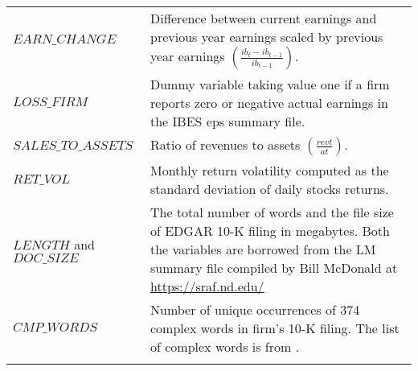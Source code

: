 \begin{ThreePartTable}
\begin{spacing}{1.0}
\begin{longtable}[t]{>{\raggedright\arraybackslash}p{4.2cm}>{\raggedright\arraybackslash}p{10.5cm}}
\addlinespace
$EARN\_CHANGE$ & Difference between current earnings and previous year earnings scaled by previous year earnings $\left( \frac{ib_t - ib_{t-1}}{ib_{t-1}} \right)$.\\
\addlinespace
$LOSS\_FIRM$ & Dummy variable taking value one if a firm reports zero or negative actual earnings in the IBES eps summary file.\\
\addlinespace
$SALES\_TO\_ASSETS$ & Ratio of revenues to assets $\left( \frac{revt}{at} \right)$.\\
\addlinespace
$RET\_VOL$ & Monthly return volatility computed as the standard deviation of daily stocks returns.\\
\addlinespace
$LENGTH$ and $DOC\_SIZE$ & The total number of words and the file size of EDGAR 10-K filing in megabytes. Both the variables are borrowed from the LM summary file compiled by Bill McDonald at \url{https://sraf.nd.edu/}\\
\addlinespace
$CMP\_WORDS$ & Number of unique occurrences of 374 complex words in firm's 10-K filing. The list of complex words is from \cite{lm_2020_firm_complexity}.\\*
\end{longtable}
\end{spacing}
\end{ThreePartTable}
\endgroup{}